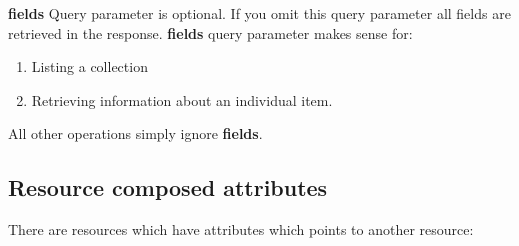 \documentclass[letterpaper,10pt,english]{sphinxmanual}
\begin{document}
\textbf{fields} Query parameter is optional. If you omit this query parameter all fields are retrieved in the response. \textbf{fields}
query parameter makes sense for:
\begin{enumerate}
\item {} 
Listing a collection

\item {} 
Retrieving information about an individual item.

\end{enumerate}

All other operations simply ignore \textbf{fields}.


\subsection{Resource composed attributes}
\label{features/roa:resource-composed-attributes}
There are resources which have attributes which points to another resource:
\end{document}
